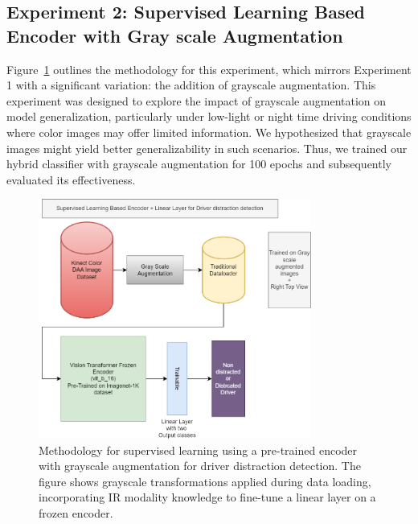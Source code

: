 \subsection{Experiment 2: Supervised Learning Based Encoder with Gray scale Augmentation}
\label{section:Methodology 2 Experiment 2: Supervised Learning Based Encoder with Gray scale Augmentation}
Figure~\ref{fig:method_flow_chart_d_a_with_aug} outlines the methodology for this experiment, which mirrors Experiment 1 with a significant variation: the addition of grayscale augmentation. This experiment was designed to explore the impact of grayscale augmentation on model generalization, particularly under low-light or night time driving conditions where color images may offer limited information. We hypothesized that grayscale images might yield better generalizability in such scenarios. Thus, we trained our hybrid classifier with grayscale augmentation for 100 epochs and subsequently evaluated its effectiveness.
\begin{figure}[h]
\begin{center}
\includegraphics[width=0.8\textwidth]{Images_Thesis/methodology_images/methodology_flowchart_d_a_with_augmentation.png}
\end{center}
\caption[Methodology for supervised learning based pre-trained encoder with gray scale augmentation for downstream task of driver distraction detection.]{Methodology for supervised learning using a pre-trained encoder with grayscale augmentation for driver distraction detection. The figure shows grayscale transformations applied during data loading, incorporating IR modality knowledge to fine-tune a linear layer on a frozen encoder.}
\label{fig:method_flow_chart_d_a_with_aug}
\end{figure}

